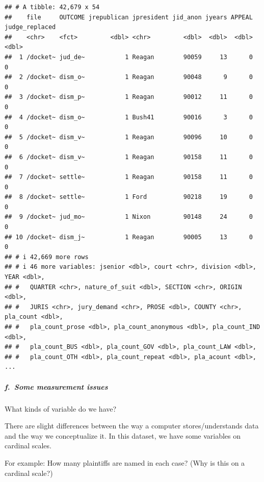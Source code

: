 \documentclass[
]{article}
\newenvironment{Shaded}{\begin{snugshade}}{\end{snugshade}}
\newcommand{\FunctionTok}[1]{\textcolor[rgb]{0.00,0.00,0.00}{#1}}
\newcommand{\NormalTok}[1]{#1}
\newcommand{\SpecialCharTok}[1]{\textcolor[rgb]{0.00,0.00,0.00}{#1}}
\begin{document}
\begin{verbatim}
## # A tibble: 42,679 x 54
##    file     OUTCOME jrepublican jpresident jid_anon jyears APPEAL judge_replaced
##    <chr>    <fct>         <dbl> <chr>         <dbl>  <dbl>  <dbl>          <dbl>
##  1 /docket~ jud_de~           1 Reagan        90059     13      0              0
##  2 /docket~ dism_o~           1 Reagan        90048      9      0              0
##  3 /docket~ dism_p~           1 Reagan        90012     11      0              0
##  4 /docket~ dism_o~           1 Bush41        90016      3      0              0
##  5 /docket~ dism_v~           1 Reagan        90096     10      0              0
##  6 /docket~ dism_v~           1 Reagan        90158     11      0              0
##  7 /docket~ settle~           1 Reagan        90158     11      0              0
##  8 /docket~ settle~           1 Ford          90218     19      0              0
##  9 /docket~ jud_mo~           1 Nixon         90148     24      0              0
## 10 /docket~ dism_j~           1 Reagan        90005     13      0              0
## # i 42,669 more rows
## # i 46 more variables: jsenior <dbl>, court <chr>, division <dbl>, YEAR <dbl>,
## #   QUARTER <chr>, nature_of_suit <dbl>, SECTION <chr>, ORIGIN <dbl>,
## #   JURIS <chr>, jury_demand <chr>, PROSE <dbl>, COUNTY <chr>, pla_count <dbl>,
## #   pla_count_prose <dbl>, pla_count_anonymous <dbl>, pla_count_IND <dbl>,
## #   pla_count_BUS <dbl>, pla_count_GOV <dbl>, pla_count_LAW <dbl>,
## #   pla_count_OTH <dbl>, pla_count_repeat <dbl>, pla_acount <dbl>, ...
\end{verbatim}

\hypertarget{f.-some-measurement-issues}{%
\subparagraph{f.~Some measurement
issues}\label{f.-some-measurement-issues}}

What kinds of variable do we have?

There are slight differences between the way a computer
stores/understands data and the way we conceptualize it. In this
dataset, we have some variables on cardinal scales.

For example: How many plaintiffs are named in each case? (Why is this on
a cardinal scale?)

\begin{Shaded}
\end{Shaded}
\end{document}
